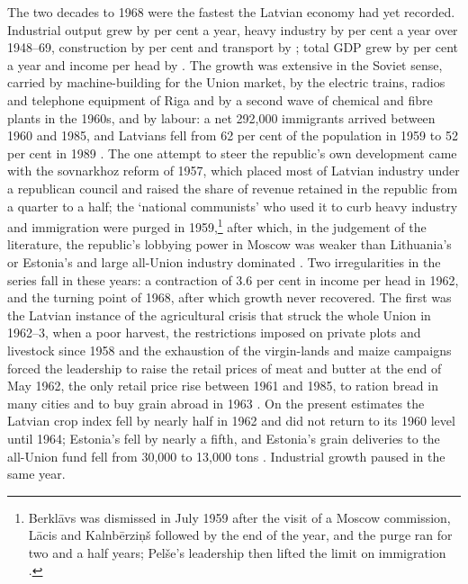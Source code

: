 The two decades to 1968 were the fastest the Latvian economy had yet recorded. Industrial output grew by  per cent a year, heavy industry by  per cent a year over 1948--69, construction by  per cent and transport by ; total GDP grew by  per cent a year and income per head by . The growth was extensive in the Soviet sense, carried by machine-building for the Union market, by the electric trains, radios and telephone equipment of Riga and by a second wave of chemical and fibre plants in the 1960s, and by labour: a net 292,000 immigrants arrived between 1960 and 1985, and Latvians fell from 62 per cent of the population in 1959 to 52 per cent in 1989 \parencites[303]{krumins_2017_tautsaimnieciba_1960}[50]{eglite_2015_migracija}[43--4]{puur_2019_turbulent}. The one attempt to steer the republic's own development came with the sovnarkhoz reform of 1957, which placed most of Latvian industry under a republican council and raised the share of revenue retained in the republic from a quarter to a half; the `national communists' who used it to curb heavy industry and immigration were purged in 1959,\footnote{Berklāvs was dismissed in July 1959 after the visit of a Moscow commission, Lācis and Kalnbērziņš followed by the end of the year, and the purge ran for two and a half years; Pelše's leadership then lifted the limit on immigration \parencites[249--50]{smith_2003_republican}[172]{strods_2006_nonviolent}[487--8]{grybkauskas_2022_economic}.} after which, in the judgement of the literature, the republic's lobbying power in Moscow was weaker than Lithuania's or Estonia's and large all-Union industry dominated \parencites[259--65]{krumins_2017_tautsaimnieciba_1950}[203--5]{king_1965_economic}[142--3, 187, 228]{years_of_dependence}. Two irregularities in the series fall in these years: a contraction of 3.6 per cent in income per head in 1962, and the turning point of 1968, after which growth never recovered. The first was the Latvian instance of the agricultural crisis that struck the whole Union in 1962--3, when a poor harvest, the restrictions imposed on private plots and livestock since 1958 and the exhaustion of the virgin-lands and maize campaigns forced the leadership to raise the retail prices of meat and butter at the end of May 1962, the only retail price rise between 1961 and 1985, to ration bread in many cities and to buy grain abroad in 1963 \parencites[17--19]{belkharoev2024}[111--14]{andreenkov2021}[299]{krumins_2017_tautsaimnieciba_1960}. On the present estimates the Latvian crop index fell by nearly half in 1962 and did not return to its 1960 level until 1964; Estonia's fell by nearly a fifth, and Estonia's grain deliveries to the all-Union fund fell from 30,000 to 13,000 tons \parencite[55]{purre1964}. Industrial growth paused in the same year.

